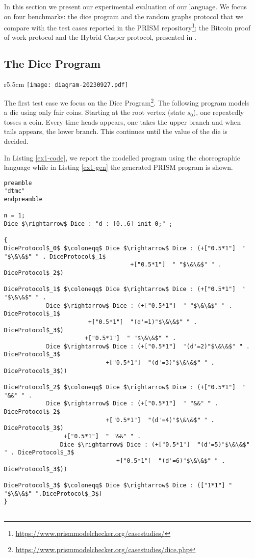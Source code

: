 In this section we present our experimental evaluation of our language. 
We focus on four benchmarks: the dice program and the random graphs protocol that we compare with the  
test cases reported in the PRISM repository\footnote{\url{https://www.prismmodelchecker.org/casestudies/}}; 
the Bitcoin proof of work protocol and the Hybrid Casper protocol, 
presented in \cite{DBLP:journals/concurrency/BistarelliNGLMV23,DBLP:journals/distribledger/GallettaLMV23}.

\subsection{The Dice Program}

\begin{wrapfigure}[9]{r}{5.5cm}
	\texttt{[image: diagram-20230927.pdf]}	
\end{wrapfigure} 
 The first test case we focus on the Dice Program\footnote{\url{https://www.prismmodelchecker.org/casestudies/dice.php}}\cite{KY76}.
 The following program models a die using only fair coins. 
 Starting at the root vertex (state $s_0$), one repeatedly tosses a coin. Every time heads appears, one takes the upper branch and when tails appears, the lower branch. 
 This continues until the value of the die is decided.

In Listing \ref{ex1-code}, we report the modelled program using the choreographic language
while in Listing \ref{ex1-gen} the generated PRISM program is shown.


\begin{lstlisting}[style=chor-color,caption={Choreographic language for the Dice Program.},captionpos=b,label={ex1-code}]
preamble
"dtmc"
endpreamble

n = 1;
Dice $\rightarrow$ Dice : "d : [0..6] init 0;" ;

{
DiceProtocol$_0$ $\coloneqq$ Dice $\rightarrow$ Dice : (+["0.5*1"]  " "$\&\&$" " . DiceProtocol$_1$
                                    +["0.5*1"]  " "$\&\&$" " .  DiceProtocol$_2$)

DiceProtocol$_1$ $\coloneqq$ Dice $\rightarrow$ Dice : (+["0.5*1"]  " "$\&\&$" " . 
 			Dice $\rightarrow$ Dice : (+["0.5*1"]  " "$\&\&$" " . DiceProtocol$_1$
           	 		 	+["0.5*1"]  "(d'=1)"$\&\&$" " . DiceProtocol$_3$)
     				   +["0.5*1"]  " "$\&\&$" " .  
   			Dice $\rightarrow$ Dice : (+["0.5*1"]  "(d'=2)"$\&\&$" " . DiceProtocol$_3$
           	 		         +["0.5*1"]  "(d'=3)"$\&\&$" " . DiceProtocol$_3$))

DiceProtocol$_2$ $\coloneqq$ Dice $\rightarrow$ Dice : (+["0.5*1"]  " "&&" " . 
	 		Dice $\rightarrow$ Dice : (+["0.5*1"]  " "&&" " . DiceProtocol$_2$
	 	                	 +["0.5*1"]  "(d'=4)"$\&\&$" " . DiceProtocol$_3$)
	 			 +["0.5*1"]  " "&&" " . 
	    		Dice $\rightarrow$ Dice : (+["0.5*1"]  "(d'=5)"$\&\&$" " . DiceProtocol$_3$
	                     		+["0.5*1"]  "(d'=6)"$\&\&$" " . DiceProtocol$_3$))

DiceProtocol$_3$ $\coloneqq$ Dice $\rightarrow$ Dice : (["1*1"] " "$\&\&$" ".DiceProtocol$_3$)
}
	
\end{lstlisting}


